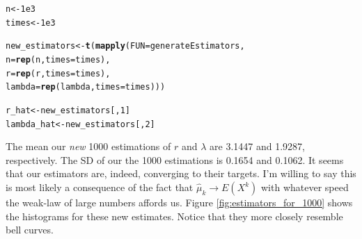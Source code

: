 \documentclass[12pt,titlepage]{article}\usepackage{graphicx, color}
\makeatletter
\newcommand{\hlfunctioncall}[1]{\textcolor[rgb]{0.501960784313725,0,0.329411764705882}{\textbf{#1}}}%
\newenvironment{kframe}{%
 \def\at@end@of@kframe{}%
 \ifinner\ifhmode%
  \def\at@end@of@kframe{\end{minipage}}%
  \begin{minipage}{\columnwidth}%
 \fi\fi%
 \def\FrameCommand##1{\hskip\@totalleftmargin \hskip-\fboxsep
 \colorbox{shadecolor}{##1}\hskip-\fboxsep
     \hskip-\linewidth \hskip-\@totalleftmargin \hskip\columnwidth}%
 \MakeFramed {\advance\hsize-\width
   \@totalleftmargin\z@ \linewidth\hsize
   \@setminipage}}%
 {\par\unskip\endMakeFramed%
 \at@end@of@kframe}
\newenvironment{knitrout}{}{} %
\makeatother
\begin{document}
\begin{knitrout}
\color{fgcolor}\begin{kframe}
\begin{alltt}
n <- 1e3
times <- 1e3

new_estimators <- \hlfunctioncall{t}(\hlfunctioncall{mapply}(FUN=generateEstimators,
                           n=\hlfunctioncall{rep}(n,times=times),
                           r=\hlfunctioncall{rep}(r,times=times),
                           lambda=\hlfunctioncall{rep}(lambda,times=times)))

r_hat <- new_estimators[,1]
lambda_hat <- new_estimators[,2]
\end{alltt}
\end{kframe}
\end{knitrout}


The mean our \textit{new} 1000 estimations of $r$ and $\lambda$ are 3.1447 and 1.9287, respectively. The SD of our the 1000 estimations is 0.1654 and 0.1062. It seems that our estimators are, indeed, converging to their targets. I'm willing to say this is most likely a consequence of the fact that $\hat{\mu}_{k} \to E(X^k)$ with whatever speed the weak-law of large numbers affords us. Figure \ref{fig:estimators_for_1000} shows the histograms for these new estimates. Notice that they more closely resemble bell curves.
\end{document}
